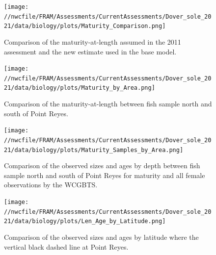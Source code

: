 \documentclass[11pt,
  english,
  a4paper,
]{article}
\begin{document}
\tagmcend\tagstructend


\begin{figure}
\centering
\texttt{[image: //nwcfile/FRAM/Assessments/CurrentAssessments/Dover\_sole\_2021/data/biology/plots/Maturity\_Comparison.png]}
\caption{Comparison of the maturity-at-length assumed in the 2011 assessment and the new estimate used in the base model.\label{fig:compare-mat-at-len}}
\end{figure}

\tagmcend\tagstructend


\begin{figure}
\centering
\texttt{[image: //nwcfile/FRAM/Assessments/CurrentAssessments/Dover\_sole\_2021/data/biology/plots/Maturity\_by\_Area.png]}
\caption{Comparison of the maturity-at-length between fish sample north and south of Point Reyes.\label{fig:spat-mat-at-len}}
\end{figure}

\tagmcend\tagstructend


\begin{figure}
\centering
\texttt{[image: //nwcfile/FRAM/Assessments/CurrentAssessments/Dover\_sole\_2021/data/biology/plots/Maturity\_Samples\_by\_Area.png]}
\caption{Comparison of the observed sizes and ages by depth between fish sample north and south of Point Reyes for maturity and all female observations by the WCGBTS.\label{fig:samples-north-south}}
\end{figure}

\tagmcend\tagstructend


\begin{figure}
\centering
\texttt{[image: //nwcfile/FRAM/Assessments/CurrentAssessments/Dover\_sole\_2021/data/biology/plots/Len\_Age\_by\_Latitude.png]}
\caption{Comparison of the observed sizes and ages by latitude where the vertical black dashed line at Point Reyes.\label{fig:fish-by-lat}}
\end{figure}
\end{document}
